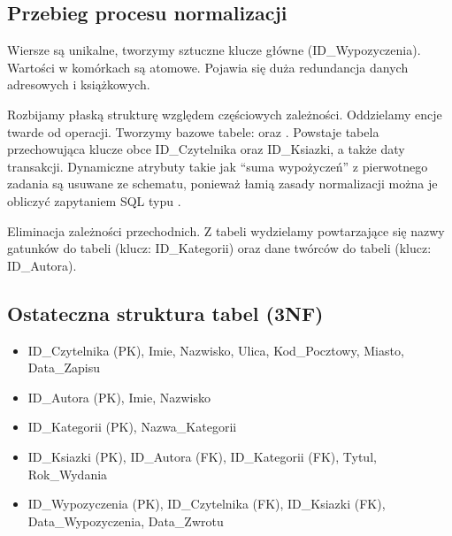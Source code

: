 \documentclass[letterpaper,10pt,english]{sphinxmanual}
\begin{document}
\subsection{Przebieg procesu normalizacji}
\label{\detokenize{rozdzial_3/index:przebieg-procesu-normalizacji}}
\sphinxAtStartPar
{}
Wiersze są unikalne, tworzymy sztuczne klucze główne (ID\_Wypozyczenia). Wartości w komórkach są atomowe. Pojawia się duża redundancja danych adresowych i książkowych.

\sphinxAtStartPar
{}
Rozbijamy płaską strukturę względem częściowych zależności. Oddzielamy encje twarde od operacji.
Tworzymy bazowe tabele:  oraz . Powstaje tabela  przechowująca klucze obce ID\_Czytelnika oraz ID\_Ksiazki, a także daty transakcji.
 Dynamiczne atrybuty takie jak “suma wypożyczeń” z pierwotnego zadania są usuwane ze schematu, ponieważ łamią zasady normalizacji \textendash{} można je obliczyć zapytaniem SQL typu .

\sphinxAtStartPar
{}
Eliminacja zależności przechodnich. Z tabeli  wydzielamy powtarzające się nazwy gatunków do tabeli  (klucz: ID\_Kategorii) oraz dane twórców do tabeli  (klucz: ID\_Autora).


\subsection{Ostateczna struktura tabel (3NF)}
\label{\detokenize{rozdzial_3/index:ostateczna-struktura-tabel-3nf}}\begin{itemize}
\item {} 
\sphinxAtStartPar
{} ID\_Czytelnika (PK), Imie, Nazwisko, Ulica, Kod\_Pocztowy, Miasto, Data\_Zapisu

\item {} 
\sphinxAtStartPar
{} ID\_Autora (PK), Imie, Nazwisko

\item {} 
\sphinxAtStartPar
{} ID\_Kategorii (PK), Nazwa\_Kategorii

\item {} 
\sphinxAtStartPar
{} ID\_Ksiazki (PK), ID\_Autora (FK), ID\_Kategorii (FK), Tytul, Rok\_Wydania

\item {} 
\sphinxAtStartPar
{} ID\_Wypozyczenia (PK), ID\_Czytelnika (FK), ID\_Ksiazki (FK), Data\_Wypozyczenia, Data\_Zwrotu

\end{itemize}
\end{document}
